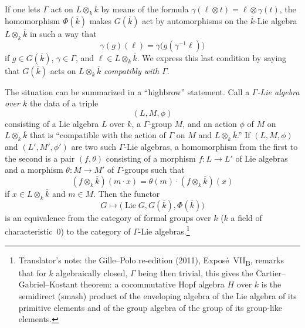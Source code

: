If one lets \(\Gamma\) act on \(L\otimes_k\overline k\) by means of the
formula \(\gamma(\ell\otimes t)=\ell\otimes\gamma(t)\), the homomorphism
\(\Phi(\overline k)\) makes \(G(\overline k)\) act by automorphisms on
the \(\overline k\)-Lie algebra \(L\otimes_k\overline k\) in such a way
that
\[
  \gamma(g)(\ell)
  =
  \gamma\bigl(g(\gamma^{-1}\ell)\bigr)
\]
if \(g\in G(\overline k)\), \(\gamma\in\Gamma\), and
\(\ell\in L\otimes_k\overline k\). We express this last condition by
saying that \(G(\overline k)\) acts on \(L\otimes_k\overline k\)
\emph{compatibly with \(\Gamma\)}.

The situation can be summarized in a ``highbrow'' statement. Call a
\emph{\(\Gamma\)-Lie algebra over \(k\)} the data of a triple
\[
  (L,M,\phi)
\]
consisting of a Lie algebra \(L\) over \(k\), a \(\Gamma\)-group \(M\),
and an action \(\phi\) of \(M\) on \(L\otimes_k\overline k\) that is
``compatible with the action of \(\Gamma\) on \(M\) and
\(L\otimes_k\overline k\).'' If \((L,M,\phi)\) and
\((L',M',\phi')\) are two such \(\Gamma\)-Lie algebras, a homomorphism
from the first to the second is a pair \((f,\theta)\) consisting of a
morphism \(f:L\to L'\) of Lie algebras and a morphism
\(\theta:M\to M'\) of \(\Gamma\)-groups such that
\[
  (f\otimes_k\overline k)(m\cdot x)
  =
  \theta(m)\cdot(f\otimes_k\overline k)(x)
\]
if \(x\in L\otimes_k\overline k\) and \(m\in M\). Then the functor
\[
  G\longmapsto
  \bigl(
    \operatorname{Lie}G,
    G(\overline k),
    \Phi(\overline k)
  \bigr)
\]
is an equivalence from the category of formal groups over \(k\)
\textup{(\(k\) a field of characteristic~\(0\))} to the category of
\(\Gamma\)-Lie algebras.\footnote{Translator's note: the Gille--Polo re-edition (2011),
Expos\'e~VII\textsubscript{B}, remarks that for \(k\) algebraically closed, \(\Gamma\) being then trivial, this
gives the Cartier--Gabriel--Kostant theorem: a cocommutative Hopf algebra \(H\) over \(k\) is the semidirect
(smash) product of the enveloping algebra of the Lie algebra of its primitive elements and of the group
algebra of the group of its group-like elements.}
